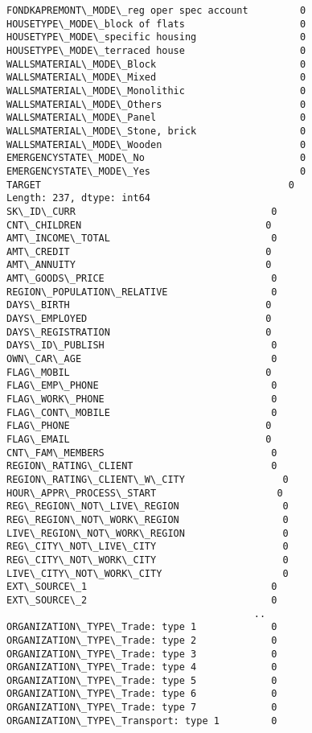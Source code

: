 \documentclass[11pt]{article}
\begin{document}
\begin{Verbatim}[commandchars=\\\{\}]
FONDKAPREMONT\_MODE\_reg oper spec account         0
HOUSETYPE\_MODE\_block of flats                    0
HOUSETYPE\_MODE\_specific housing                  0
HOUSETYPE\_MODE\_terraced house                    0
WALLSMATERIAL\_MODE\_Block                         0
WALLSMATERIAL\_MODE\_Mixed                         0
WALLSMATERIAL\_MODE\_Monolithic                    0
WALLSMATERIAL\_MODE\_Others                        0
WALLSMATERIAL\_MODE\_Panel                         0
WALLSMATERIAL\_MODE\_Stone, brick                  0
WALLSMATERIAL\_MODE\_Wooden                        0
EMERGENCYSTATE\_MODE\_No                           0
EMERGENCYSTATE\_MODE\_Yes                          0
TARGET                                           0
Length: 237, dtype: int64
SK\_ID\_CURR                                  0
CNT\_CHILDREN                                0
AMT\_INCOME\_TOTAL                            0
AMT\_CREDIT                                  0
AMT\_ANNUITY                                 0
AMT\_GOODS\_PRICE                             0
REGION\_POPULATION\_RELATIVE                  0
DAYS\_BIRTH                                  0
DAYS\_EMPLOYED                               0
DAYS\_REGISTRATION                           0
DAYS\_ID\_PUBLISH                             0
OWN\_CAR\_AGE                                 0
FLAG\_MOBIL                                  0
FLAG\_EMP\_PHONE                              0
FLAG\_WORK\_PHONE                             0
FLAG\_CONT\_MOBILE                            0
FLAG\_PHONE                                  0
FLAG\_EMAIL                                  0
CNT\_FAM\_MEMBERS                             0
REGION\_RATING\_CLIENT                        0
REGION\_RATING\_CLIENT\_W\_CITY                 0
HOUR\_APPR\_PROCESS\_START                     0
REG\_REGION\_NOT\_LIVE\_REGION                  0
REG\_REGION\_NOT\_WORK\_REGION                  0
LIVE\_REGION\_NOT\_WORK\_REGION                 0
REG\_CITY\_NOT\_LIVE\_CITY                      0
REG\_CITY\_NOT\_WORK\_CITY                      0
LIVE\_CITY\_NOT\_WORK\_CITY                     0
EXT\_SOURCE\_1                                0
EXT\_SOURCE\_2                                0
                                           ..
ORGANIZATION\_TYPE\_Trade: type 1             0
ORGANIZATION\_TYPE\_Trade: type 2             0
ORGANIZATION\_TYPE\_Trade: type 3             0
ORGANIZATION\_TYPE\_Trade: type 4             0
ORGANIZATION\_TYPE\_Trade: type 5             0
ORGANIZATION\_TYPE\_Trade: type 6             0
ORGANIZATION\_TYPE\_Trade: type 7             0
ORGANIZATION\_TYPE\_Transport: type 1         0

\end{Verbatim}
\end{document}
